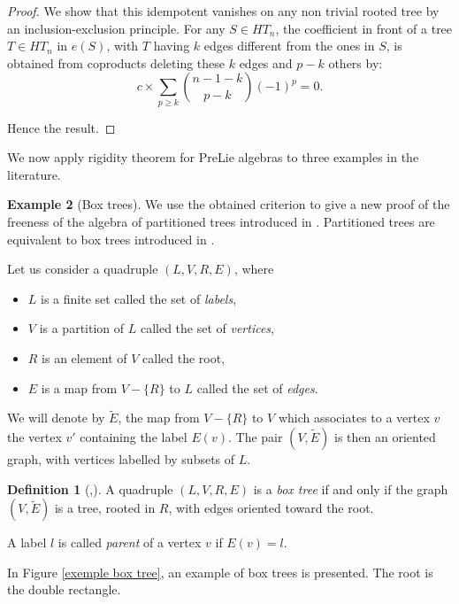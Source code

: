 \documentclass[11pt,leqno]{amsart}
\theoremstyle{definition}
\newtheorem{definition}{Definition}[subsection]
\newtheorem{example}[definition]{Example}
\theoremstyle{plain}
\begin{document}
\begin{proof}
We show that this idempotent vanishes on any non trivial rooted tree by an inclusion-exclusion principle. For any $S \in HT_n$, the coefficient in front of a tree $T \in HT_n$ in $e(S)$, with $T$ having $k$ edges different from the ones in $S$, is obtained from coproducts deleting these $k$ edges and $p-k$ others  by:
\begin{equation*}
c \times \sum_{p \geq k} \binom{n-1-k}{p-k} (-1)^p=0.
\end{equation*}

Hence the result.
\end{proof}

We now apply rigidity theorem for PreLie algebras to three examples in the literature.

\begin{example}[Box trees] \label{Box trees}
We use the obtained criterion to give a new proof of the freeness of the algebra of partitioned trees introduced in \cite{FPL}. Partitioned trees are equivalent to box trees introduced in \cite{mar2}.

Let us consider a quadruple $\left(L,V,R,E\right)$, where
\begin{itemize}
\item $L$ is a finite set called the set of \emph{labels},
\item $V$ is a partition of $L$ called the set of \emph{vertices},
\item $R$ is an element of $V$ called the root,
\item $E$ is a map from $V-\{R\}$ to $L$ called the set of \emph{edges}. 
\end{itemize} 
We will denote by $\tilde{E}$, the map from $V-\{R\}$ to $V$ which associates to a vertex $v$ the vertex $v'$ containing the label $E\left(v\right)$. The pair $\left(V,\tilde{E}\right)$ is then an oriented graph, with vertices labelled by subsets of $L$.

\begin{definition}[\cite{FPL},\cite{mar2}]
A quadruple $\left(L,V,R,E\right)$ is a \emph{box tree} if and only if the graph $\left(V,\tilde{E}\right)$ is a tree, rooted in $R$, with edges oriented toward the root.

A label $l$ is called \emph{parent} of a vertex $v$ if $E\left(v\right)=l$.
\end{definition}	

In Figure \ref{exemple box tree}, an example of box trees is presented. The root is the double rectangle.


\end{example}
\end{document}
